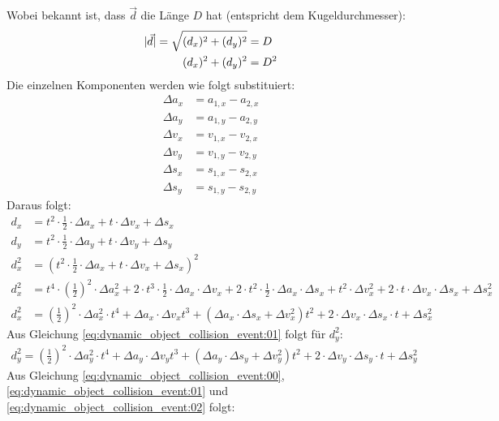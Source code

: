 Wobei bekannt ist, dass $\vec{d}$ die Länge $D$ hat (entspricht dem Kugeldurchmesser):
\begin{align}
    \lvert \vec{d} \rvert = \sqrt{(d_x)^2 + (d_y)^2} &= D\\
    (d_x)^2 + (d_y)^2 &= D^2\label{eq:dynamic_object_collision_event:00}
\end{align}
Die einzelnen Komponenten werden wie folgt substituiert:
\begin{align}
    \Delta a_x &= a_{1,x} - a_{2,x}\\
    \Delta a_y &= a_{1,y} - a_{2,y}\\
    \Delta v_x &= v_{1,x} - v_{2,x}\\
    \Delta v_y &= v_{1,y} - v_{2,y}\\
    \Delta s_x &= s_{1,x} - s_{2,x}\\
    \Delta s_y &= s_{1,y} - s_{2,y}
\end{align}
Daraus folgt:
\begin{align}
    d_x &= t^2 \cdot \frac{1}{2} \cdot \Delta a_x + t \cdot \Delta v_x + \Delta s_x\\
    d_y &= t^2 \cdot \frac{1}{2} \cdot \Delta a_y + t \cdot \Delta v_y + \Delta s_y\\
    d_x^2 &= (t^2 \cdot \frac{1}{2} \cdot \Delta a_x + t \cdot \Delta v_x + \Delta s_x)^2\\
    d_x^2 &= t^4 \cdot (\frac{1}{2})^2 \cdot \Delta a_x^2 + 2 \cdot t^3 \cdot \frac{1}{2} \cdot \Delta a_x \cdot \Delta v_x + 2 \cdot t^2 \cdot \frac{1}{2} \cdot \Delta a_x \cdot \Delta s_x  + t^2 \cdot \Delta v_x^2 + 2 \cdot t \cdot \Delta v_x \cdot \Delta s_x + \Delta s_x^2\\
    d_x^2 &= (\frac{1}{2})^2 \cdot \Delta a_x^2 \cdot t^4 + \Delta a_x \cdot \Delta v_x t^3 + (\Delta a_x \cdot \Delta s_x + \Delta v_x^2) t^2 + 2 \cdot \Delta v_x \cdot \Delta s_x \cdot t + \Delta s_x^2\label{eq:dynamic_object_collision_event:01}
\end{align}
Aus Gleichung \ref{eq:dynamic_object_collision_event:01} folgt für $d_y^2$:
\begin{align}
    d_y^2 = (\frac{1}{2})^2 \cdot \Delta a_y^2 \cdot t^4 + \Delta a_y \cdot \Delta v_y t^3 + (\Delta a_y \cdot \Delta s_y + \Delta v_y^2) t^2 + 2 \cdot \Delta v_y \cdot \Delta s_y \cdot t + \Delta s_y^2\label{eq:dynamic_object_collision_event:02}
\end{align}
Aus Gleichung \ref{eq:dynamic_object_collision_event:00}, \ref{eq:dynamic_object_collision_event:01} und \ref{eq:dynamic_object_collision_event:02} folgt:
